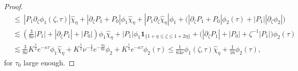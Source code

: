 \documentclass[11pt]{aims}
\theoremstyle{definition}
\newcommand{\pa}{\partial}
\numberwithin{equation}{section}
\begin{document}
\begin{proof}
\begin{align}
\nonumber &  \leq \ |P_1 \pa_\zeta \phi_1(\zeta, \tau)| \hat \chi_{\eta} + |\pa_\zeta P_1 + P_0 | \phi_1 \hat \chi_{\eta}+ |P_1 \pa_\zeta \hat \chi_{\eta}| \phi_1+\big( |\pa_\zeta P_1 + P_0 | \phi_2(\tau)+|P_1||\pa_\zeta \phi_2|\big) \\
\nonumber &  \lesssim \left( \frac{3}{8 \nu} |P_1| +  |\pa_\zeta P_1| + |P_0 | \right) \phi_1 \hat \chi_{\eta}   +|P_1|\phi_1 \mathbf{1}_{\{1+\eta\leq \zeta\leq 1+2\eta\}}+\big( |\pa_\zeta P_1| + |P_0 |+\zeta^{-1}|P_1|\big) \phi_2(\tau) \\
 & \lesssim \frac{3}{8\nu} K^\frac{5}{4} e^{-\kappa \tau} \phi_1 \hat \chi_{\eta}  + K^\frac{5}{2} \nu^{-\frac 32} e^{- \frac{3\eta}{8\nu}} \phi_2  +  K^{\frac{5}{4}} e^{-\kappa \tau} \phi_2(\tau) \leq \frac{1}{64\nu}\phi_1(\zeta, \tau) \hat \chi_{\eta} + \frac{1}{16}\phi_2(\tau), \label{exterior:bd:inter3}
\end{align}
for $\tau_0$ large enough.


\end{proof}
\end{document}
